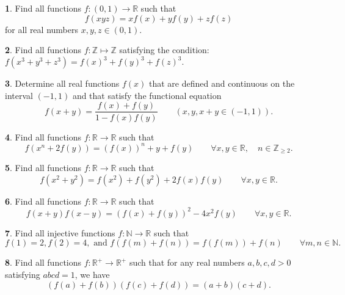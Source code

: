 \documentclass{article}
\theoremstyle{definition}
\newtheorem{p}{}
\begin{document}
\begin{p}
Find all functions $f: (0,1) \to \mathbb{R}$ such that
\[f(xyz)=xf(x)+yf(y)+zf(z)\]
for all real numbers $x,y,z \in (0,1)$.
\end{p}







\begin{p}
Find all functions $f: \mathbb{Z} \mapsto \mathbb{Z}$ satisfying the condition: $f(x^3 +y^3 +z^3 )=f(x)^3+f(y)^3+f(z)^3.$
\end{p}



\begin{p}
Determine all real functions $f(x)$ that are defined and continuous on the interval $(-1, 1)$ and that satisfy the functional equation
\[f(x+y)=\frac{f(x)+f(y)}{1-f(x) f(y)} \qquad (x, y, x + y \in (-1, 1)).\]
\end{p}





\begin{p}
Find all functions $f: \mathbb R\to \mathbb R$ such that
\[f(x^n+2f(y))=(f(x))^n +y+f(y) \qquad \forall x, y \in \mathbb R,\quad n \in \mathbb Z_{\geq 2}.\]
\end{p}



\begin{p}
Find all functions $ f: \mathbb{R}\to\mathbb{R}$ such that 
\[ f(x^2+y^2)=f(x^2)+f(y^2)+2f(x)f(y) \qquad \forall x,y \in \mathbb R.\]
\end{p}



\begin{p}
Find all functions $ f: \mathbb{R}\to\mathbb{R}$ such that 
\[ f(x+y)f(x-y)=\left(f(x)+f(y)\right)^2-4x^2f(y) \qquad \forall x,y \in \mathbb R.\]
\end{p}



\begin{p}
Find all injective functions $ f: \mathbb{N}\to\mathbb{R}$ such that
\[f(1)=2,f(2)=4, \text{ and } f(f(m)+f(n))=f(f(m))+f(n) \qquad \forall m,n \in \mathbb N.\]
\end{p}



\begin{p}
Find all functions $f:\mathbb{R}^+\to\mathbb{R}^+$ such that for any real numbers $a, b, c, d >0$ satisfying $abcd=1$, we have \[(f(a)+f(b))(f(c)+f(d))=(a+b)(c+d).\]
\end{p}
\end{document}
